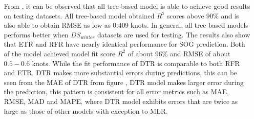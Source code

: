 From , it can be observed that all tree-based model is able to achieve good results on testing datasets. All tree-based model obtained $R^2$ scores above $90\%$ and is also able to obtain RMSE as low as 0.409 knots. In general, all tree based models performs better when $DS_{winter}$ datasets are used for testing. The results also show that ETR and RFR have nearly identical performance for SOG prediction. Both of the model achieved model fit score $R^2$ of about $96\%$ and RMSE of about $0.5-0.6$ knots. While the fit performance of DTR is comparable to both RFR and ETR, DTR makes more substantial errors during predictions, this can be seen from the MAE of DTR from figure , DTR model makes larger error during the prediction, this pattern is consistent for all error metrics such as MAE, RMSE, MAD and MAPE, where DTR model exhibits errors that are twice as large as those of other models with exception to MLR.\\



